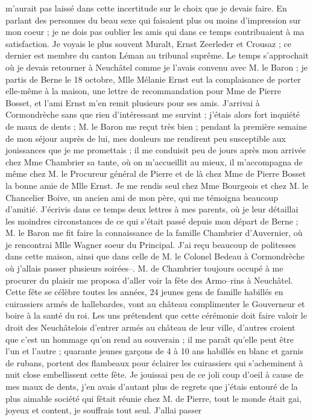 \documentclass[12pt]{article}
\begin{document}
 m’aurait pas laissé dans cette incertitude
sur le choix que je devais faire. En parlant des personnes du beau sexe qui faisaient plus ou moins
d’impression sur mon coeur ; je ne dois pas oublier les amis qui dans ce temps contribuaient à ma
satisfaction. Je voyais le plus souvent Muralt, Ernst Zeerleder et Crousaz ; ce dernier est membre
du canton Léman au tribunal suprême. Le temps s’approchait où je devais retourner à Neuchâtel comme
je l’avais convenu avec M. le Baron ; je partis de Berne le 18 octobre, Mlle Mélanie Ernst eut la
complaisance de porter elle-même à la maison, une lettre de recommandation pour Mme de Pierre
Bosset, et l’ami Ernst m’en remit plusieurs pour ses amis. J’arrivai à Cormondrèche sans que rien
d’intéressant me survint ; j’étais alors fort inquiété de maux de dents ; M. le Baron me reçut très
bien ; pendant la première semaine de mon séjour auprès de lui, mes douleurs me rendirent peu
susceptible aux jouissances que je me promettais ; il me conduisit peu de jours après mon arrivée
chez Mme Chambrier sa tante, où on m’accueillit au mieux, il m’accompagna de même chez M. le
Procureur général de Pierre et de là chez Mme de Pierre Bosset la bonne amie de Mlle Ernst. Je me
rendis seul chez Mme Bourgeois et chez M. le Chancelier Boive, un ancien ami de mon père, qui me
témoigna beaucoup d’amitié. J’écrivis dans ce temps deux lettres à mes parents, où je leur détaillai
les moindres circonstances de ce qui s’était passé depuis mon départ de Berne ; M. le Baron me fit
faire la connaissance de la famille Chambrier d’Auvernier, où je rencontrai Mlle Wagner soeur du
Principal. J’ai reçu beaucoup de politesses dans cette maison, ainsi que dans celle de M. le Colonel
Bedeau à Cormondrèche où j’allais passer plusieurs soirées–. M. de Chambrier toujours occupé à me
procurer du plaisir me proposa d’aller voir la fête des Armo–rins à Neuchâtel. Cette fête se célèbre
toutes les années, 24 jeunes gens de famille habillés en cuirassiers armés de hallebardes, vont au
château complimenter le Gouverneur et boire à la santé du roi. Les uns prétendent que cette
cérémonie doit faire valoir le droit des Neuchâtelois d’entrer armés au château de leur ville,
d’autres croient que c’est un hommage qu’on rend au souverain ; il me paraît qu’elle peut être l’un
et l’autre ; quarante jeunes garçons de 4 à 10 ans habillés en blanc et garnis de rubans, portent
des flambeaux pour éclairer les cuirassiers qui s’acheminent à nuit close embellissent cette fête.
Je jouissai peu de ce joli coup d’oeil à cause de mes maux de dents, j’en avais d’autant plus de
regrets que j’étais entouré de la plus aimable société qui fêtait réunie chez M. de Pierre, tout le
monde était gai, joyeux et content, je souffrais tout seul. J’allai passer
\end{document}
